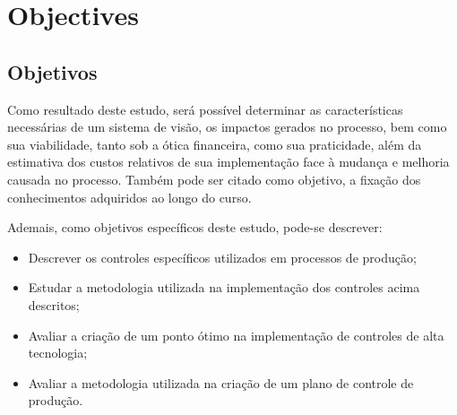 


\chapter{Objectives}
\label{cap_objectives}
\section{Objetivos}

Como resultado deste estudo, será possível determinar as características necessárias de um sistema de visão, os impactos gerados no processo, bem como  sua viabilidade, tanto sob a ótica financeira, como sua praticidade, além da estimativa dos custos relativos de sua implementação face à mudança e melhoria causada no processo. Também pode ser citado como objetivo, a fixação dos conhecimentos adquiridos ao longo do curso.

Ademais, como objetivos específicos deste estudo, pode-se descrever:
\begin{itemize}
    \item Descrever os controles específicos utilizados em processos de produção;
    \item Estudar a metodologia utilizada na implementação dos controles acima descritos;
    \item Avaliar a criação de um ponto ótimo na implementação de controles de alta tecnologia;
    \item Avaliar a metodologia utilizada na criação de um plano de controle de produção.
\end{itemize}






